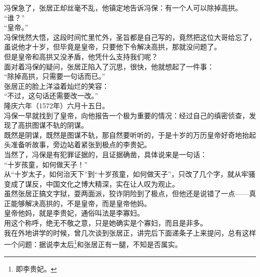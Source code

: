 \begin{multicols}{\theparacolNo}
冯保急了，张居正却丝毫不乱，他镇定地告诉冯保：有一个人可以除掉高拱。\\

“谁？”\\

“皇帝。”\\

冯保恍然大悟，这段时间忙里忙外，圣旨都是自己写的，竟然把这位大哥给忘了，虽说他才十岁，但毕竟是皇帝，只要他下令解决高拱，那就没问题了。\\

但是皇帝和高拱又没矛盾，他凭什么支持我们呢？\\

面对着冯保的疑问，张居正陷入了沉思，很快，他就想起了一件事：\\

“除掉高拱，只需要一句话而已。”\\

张居正的脸上洋溢着灿烂的笑容：\\

“不过，这句话还需要改一改。”\\

隆庆六年（1572年）六月十五日。\\

冯保一早就找到了皇帝，向他报告一个极为重要的情况：经过自己的缜密侦查，发现了高拱图谋不轨的阴谋。\\

既然是阴谋，既然是图谋不轨，那自然要听听的，于是十岁的万历皇帝好奇地抬起头准备听故事，旁边站着紧张到极点的李贵妃。\\

当然了，冯保是有犯罪证据的，且证据确凿，具体说来是一句话：\\

“十岁孩童，如何做天子！”\\

从“十岁太子，如何治天下”到“十岁孩童，如何做天子”，只改了几个字，就从牢骚变成了谋反，中国文化之博大精深，实在让人叹为观止。\\

虽然张居正搞文字狱，耍两面派，狡诈阴险到了极点，但他还是说错了一点——真正能够解决高拱的，不是皇帝，而是皇帝他妈。\\

皇帝他妈，就是李贵妃，通俗叫法是李寡妇。\\

用这个称呼，绝无不敬之意，只是她确实是个寡妇，而且是非多。\\

我在外地讲学的时候，曾几次谈到张居正，讲完后下面递条子上来提问，总有这样一个问题：据说李太后\footnote{即李贵妃。}和张居正有一腿，不知是否属实。\\


\end{multicols}
